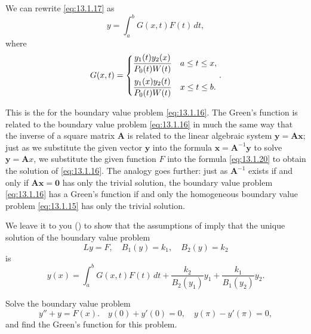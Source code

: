 We  can rewrite \eqref{eq:13.1.17} as
\begin{equation} \label{eq:13.1.20}
y=\int_{a}^{b} G(x,t)F(t)\,dt,
\end{equation}
where
\[
G(x,t)=
\begin{cases}
\dfrac{y_{1}(t)y_{2}(x)}{P_{0}(t)W(t)}&a\le t\le x,\\\addlinespace
\dfrac{y_{1}(x)y_{2}(t)}{P_{0}(t)W(t)}&x\le t\le b.
\end{cases}.
\]

This is the
for the boundary value problem \eqref{eq:13.1.16}.
The Green's function  is related to the boundary value problem
\eqref{eq:13.1.16} in much the
same way that the inverse of a square matrix ${\mathbf A}$ is related to
the linear algebraic system ${\mathbf y}={\mathbf A}{\mathbf x}$;   just as
we substitute the given vector ${\mathbf y}$ into the formula
${\mathbf x}={\mathbf A}^{-1}{\mathbf y}$ to solve
 ${\mathbf y} ={\mathbf Ax}$, we substitute the given
function $F$ into the formula \eqref{eq:13.1.20} to obtain the solution of
\eqref{eq:13.1.16}. The analogy goes further:
just as ${\mathbf A}^{-1}$ exists if and only if
 ${\mathbf A}{\mathbf x} ={\mathbf 0}$
has only the trivial solution, the boundary value problem  \eqref{eq:13.1.16}
has a Green's function if and only the homogeneous boundary value problem
\eqref{eq:13.1.15}  has only the trivial solution.

We leave it to you () to show that the
assumptions of  imply that the unique solution
of the boundary value problem
\[
Ly=F,\quad B_{1}(y)=k_{1},\quad B_{2}(y)=k_{2}
\]
is
\[
y(x)=\int_{a}^{b}G(x,t)F(t)\,dt +\frac{k_{2}}{B_{2}(y_{1})}y_{1}+
\frac{k_{1}}{B_{1}(y_{2})}y_{2}.
\]

\begin{example}\label{example:13.1.6}
Solve the boundary value problem
\begin{equation} \label{eq:13.1.21}
y''+y=F(x).\quad y(0)+y'(0)=0,\quad y(\pi)-y'(\pi)=0,
\end{equation}
and find the Green's
function
for this problem.
\end{example}

